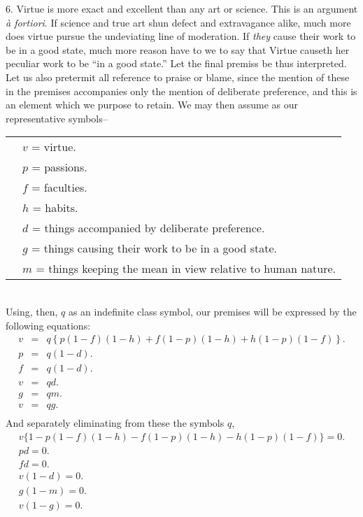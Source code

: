 \documentclass[oneside]{book}
\begin{document}
6. Virtue is more exact and excellent than any art or science.
This is an argument \textit{\`a fortiori}. If science and true art shun
defect and extravagance alike, much more does virtue pursue the
undeviating line of moderation. If \textit{they} cause their work to be
in a good state, much more reason have to we to say that Virtue
causeth her peculiar work to be ``in a good state.'' Let the
final premiss be thus interpreted. Let us also pretermit all reference
to praise or blame, since the mention of these in the premises
accompanies only the mention of deliberate preference, and
this is an element which we purpose to retain. We may then
assume as our representative symbols-- \\
\begin{tabular}{c l}
&$v$ = virtue.\\
&$p$ = passions.\\
&$f$ = faculties.\\
&$h$ = habits.\\
&$d$ = things accompanied by deliberate preference.\\
&$g$ = things causing their work to be in a good state.\\
&$m$ = things keeping the mean in view relative to human nature.
\end{tabular}\\
Using, then, $q$ as an indefinite class symbol, our premises will be
expressed by the following equations:
\begin{eqnarray*}
v &=& q\left\{p\left(1-f\right)\left(1- h\right)%
   + f\left(1-p\right)\left(1-h\right)%
   + h\left(1-p\right)\left(1-f\right)\right\}. \\
p &=& q\left(1-d\right).\\
f &=& q\left(1-d\right).\\
v &=& qd.\\
g &=& qm.\\
v &=& qg.\\
\end{eqnarray*}
And separately eliminating from these the symbols $q$,
\setcounter{equation}{0}
\begin{eqnarray}
v \{1-p\left(1-f\right)\left(1-h\right)
  - f\left(1-p\right)\left(1-h\right)
  - h\left(1-p\right)\left(1-f\right)\}=0.\\
  pd=0.\\
  fd=0.\\
  v\left(1-d\right)=0.\\
  g\left(1-m\right)=0.\\
  v\left(1-g\right)=0.
\end{eqnarray}
\end{document}
